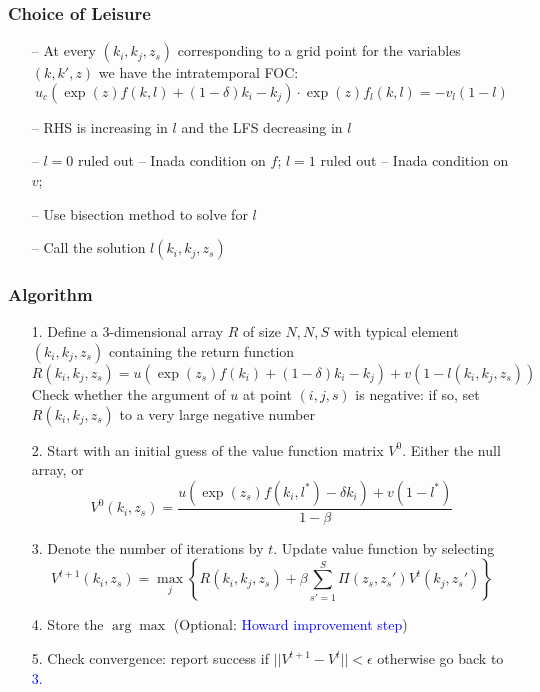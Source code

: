 \documentclass[aspectratio=169, 11pt]{beamer}
\begin{document}
\begin{frame}
\frametitle{Choice of Leisure}
  \begin{itemize}
    \item[--] At every $\left(k_{i}, k_{j}, z_{s}\right)$ corresponding to a grid point for the variables $\left(k,k',z\right)$ we have the intratemporal FOC:
    \[
      u_{c}\left(\exp\left(z\right)f\left(k,l\right)+\left(1-\delta\right)k_{i}-k_{j}\right)\cdot\exp\left(z\right)f_{l}\left(k,l\right)=-v_{l}\left(1-l\right)
    \]
    \item[--] RHS is increasing in $l$ and the LFS decreasing in $l$
    \item[--] $l=0$ ruled out -- Inada condition on $f$; $l=1$ ruled out -- Inada condition on $v$;
    \item[--] Use bisection method to solve for $l$
    \item[--] Call the solution $l\left(k_{i}, k_{j}, z_{s}\right)$
  \end{itemize}
\end{frame}

\begin{frame}
\frametitle{Algorithm}
  \begin{itemize}
    \item[1.] Define a 3-dimensional array $R$ of size $N, N, S$ with typical element $\left(k_{i}, k_{j}, z_{s}\right)$ containing the return function
    \[
      R\left(k_{i},k_{j},z_{s}\right)=u\left(\exp\left(z_{s}\right)f\left(k_{i}\right)+\left(1-\delta\right)k_{i}-k_{j}\right)+v\left(1-l\left(k_{i},k_{j},z_{s}\right)\right)
    \]
    Check whether the argument of $u$ at point $(i,j,s)$ is negative: if so, set $R\left(k_{i},k_{j},z_{s}\right)$ to a very large negative number
    \item[2.] Start with an initial guess of the value function matrix $V^{0}$. Either the null array, or
    \[
      V^{0}\left(k_{i},z_{s}\right)=\frac{u\left(\exp\left(z_{s}\right)f\left(k_{i},l^{*}\right)-\delta k_{i}\right)+v\left(1-l^{*}\right)}{1-\beta}
    \]
    \item[3.] Denote the number of iterations by $t$. Update value function by selecting
    \[
      V^{t+1}\left(k_{i},z_{s}\right)=\max_{j}\left\{ R\left(k_{i},k_{j},z_{s}\right)+\beta\sum_{s'=1}^{S}\Pi\left(z_{s},z_{s}'\right)V^{t}\left(k_{j},z_{s}'\right)\right\}
    \]
    \item[4.] Store the $\arg\max$ (Optional: \textcolor{blue}{Howard improvement step})
    \item[5.] Check convergence: report success if $||V^{t+1}-V^{t}||<\epsilon$ otherwise go back to \textcolor{blue}{3.}
  \end{itemize}
\end{frame}
\end{document}
